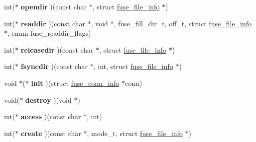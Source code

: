 \begin{DoxyCompactItemize}
\item 
int($\ast$ {\bfseries opendir} )(const char $\ast$, struct \hyperlink{structfuse__file__info}{fuse\+\_\+file\+\_\+info} $\ast$)\hypertarget{structfuse__operations_abe51ac9a15f28e68de9b7b09199cbbe2}{}\label{structfuse__operations_abe51ac9a15f28e68de9b7b09199cbbe2}

\item 
int($\ast$ {\bfseries readdir} )(const char $\ast$, void $\ast$, fuse\+\_\+fill\+\_\+dir\+\_\+t, off\+\_\+t, struct \hyperlink{structfuse__file__info}{fuse\+\_\+file\+\_\+info} $\ast$, enum fuse\+\_\+readdir\+\_\+flags)\hypertarget{structfuse__operations_ae269583c4bfaf4d9a82e1d51a902cd5c}{}\label{structfuse__operations_ae269583c4bfaf4d9a82e1d51a902cd5c}

\item 
int($\ast$ {\bfseries releasedir} )(const char $\ast$, struct \hyperlink{structfuse__file__info}{fuse\+\_\+file\+\_\+info} $\ast$)\hypertarget{structfuse__operations_ac3760f5298013d4255bed9932e719db1}{}\label{structfuse__operations_ac3760f5298013d4255bed9932e719db1}

\item 
int($\ast$ {\bfseries fsyncdir} )(const char $\ast$, int, struct \hyperlink{structfuse__file__info}{fuse\+\_\+file\+\_\+info} $\ast$)\hypertarget{structfuse__operations_a57c3cd511dd199cd52e8fe145e9b4b20}{}\label{structfuse__operations_a57c3cd511dd199cd52e8fe145e9b4b20}

\item 
void $\ast$($\ast$ {\bfseries init} )(struct \hyperlink{structfuse__conn__info}{fuse\+\_\+conn\+\_\+info} $\ast$conn)\hypertarget{structfuse__operations_a25a852f98c2e8a6f8a3689c53e093ee6}{}\label{structfuse__operations_a25a852f98c2e8a6f8a3689c53e093ee6}

\item 
void($\ast$ {\bfseries destroy} )(void $\ast$)\hypertarget{structfuse__operations_a533b13773c1879bed793b36a25d65ba8}{}\label{structfuse__operations_a533b13773c1879bed793b36a25d65ba8}

\item 
int($\ast$ {\bfseries access} )(const char $\ast$, int)\hypertarget{structfuse__operations_a4dd366b9f74ead6927fb75afb91863bc}{}\label{structfuse__operations_a4dd366b9f74ead6927fb75afb91863bc}

\item 
int($\ast$ {\bfseries create} )(const char $\ast$, mode\+\_\+t, struct \hyperlink{structfuse__file__info}{fuse\+\_\+file\+\_\+info} $\ast$)\hypertarget{structfuse__operations_a8f5349c22f360bda57ff10d10486d148}{}\label{structfuse__operations_a8f5349c22f360bda57ff10d10486d148}


\end{DoxyCompactItemize}
